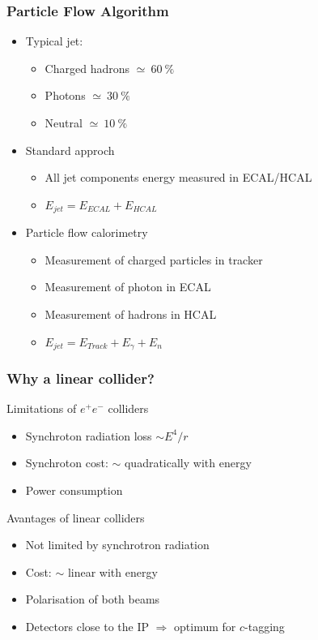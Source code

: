 \documentclass{beamer}
\begin{document}
  \begin{frame}[plain]
    \frametitle{Particle Flow Algorithm}

    \begin{itemize}
      \item Typical jet:
        \begin{itemize}
          \item Charged hadrons $\simeq~60~\%$
          \item Photons $\simeq~30~\%$
          \item Neutral $\simeq~10~\%$
        \end{itemize}
      \item Standard approch
        \begin{itemize}
          \item All jet components energy measured in ECAL/HCAL
          \item $E_{jet} = E_{ECAL} + E_{HCAL}$
        \end{itemize}
      \item Particle flow calorimetry
        \begin{itemize}
          \item Measurement of charged particles in tracker
          \item Measurement of photon in ECAL
          \item Measurement of hadrons in HCAL
          \item $E_{jet} = E_{Track} + E_{\gamma} + E_n$
        \end{itemize}
    \end{itemize}
  \end{frame}


  \begin{frame}[plain]
    \frametitle{Why a linear collider?}

    \begin{block}{Limitations of $e^+e^-$ colliders}
      \begin{itemize}
        \item Synchroton radiation loss $\sim E^{4}/r$
        \item Synchroton cost: $\sim$ quadratically with energy
        \item Power consumption
      \end{itemize}
    \end{block}
    
    \begin{block}{Avantages of linear colliders}
      \begin{itemize}
        \item Not limited by synchrotron radiation
        \item Cost: $\sim$ linear with energy
        \item Polarisation of both beams
        \item Detectors close to the IP $\Rightarrow$ optimum for $c$-tagging
      \end{itemize}
    \end{block}
  \end{frame}
\end{document}
